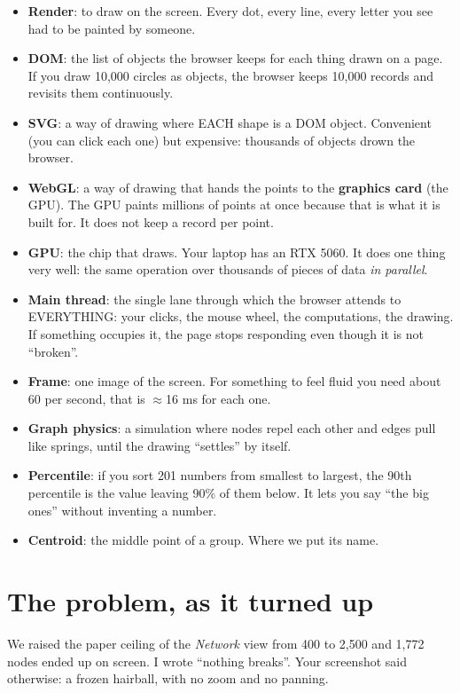 \documentclass[11pt,a4paper]{article}
\begin{document}
\begin{itemize}
  \item \textbf{Render}: to draw on the screen. Every dot, every line, every letter you see had
        to be painted by someone.
  \item \textbf{DOM}: the list of objects the browser keeps for each thing drawn on a page. If
        you draw 10,000 circles as objects, the browser keeps 10,000 records and revisits them
        continuously.
  \item \textbf{SVG}: a way of drawing where EACH shape is a DOM object. Convenient (you can
        click each one) but expensive: thousands of objects drown the browser.
  \item \textbf{WebGL}: a way of drawing that hands the points to the \textbf{graphics card}
        (the GPU). The GPU paints millions of points at once because that is what it is built
        for. It does not keep a record per point.
  \item \textbf{GPU}: the chip that draws. Your laptop has an RTX 5060. It does one thing very
        well: the same operation over thousands of pieces of data \emph{in parallel}.
  \item \textbf{Main thread}: the single lane through which the browser attends to EVERYTHING:
        your clicks, the mouse wheel, the computations, the drawing. If something occupies it,
        the page stops responding even though it is not ``broken''.
  \item \textbf{Frame}: one image of the screen. For something to feel fluid you need about 60
        per second, that is $\approx$16 ms for each one.
  \item \textbf{Graph physics}: a simulation where nodes repel each other and edges pull like
        springs, until the drawing ``settles'' by itself.
  \item \textbf{Percentile}: if you sort 201 numbers from smallest to largest, the 90th
        percentile is the value leaving 90\% of them below. It lets you say ``the big ones''
        without inventing a number.
  \item \textbf{Centroid}: the middle point of a group. Where we put its name.
\end{itemize}

\section{The problem, as it turned up}

We raised the paper ceiling of the \emph{Network} view from 400 to 2,500 and 1,772 nodes ended
up on screen. I wrote ``nothing breaks''. Your screenshot said otherwise: a frozen hairball,
with no zoom and no panning.
\end{document}
